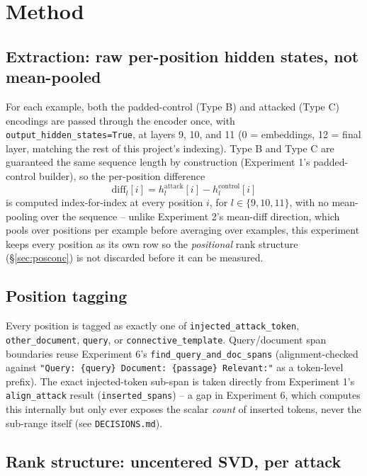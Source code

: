 \documentclass[11pt]{article}
\begin{document}
\section{Method}
\label{sec:setup}

\subsection{Extraction: raw per-position hidden states, not mean-pooled}

For each example, both the padded-control (Type B) and attacked (Type C)
encodings are passed through the encoder once, with
\texttt{output\_hidden\_states=True}, at layers 9, 10, and 11 (0 =
embeddings, 12 = final layer, matching the rest of this project's
indexing). Type B and Type C are guaranteed the same sequence length by
construction (Experiment 1's padded-control builder), so the per-position
difference
\[
\text{diff}_l[i] = h^{\text{attack}}_l[i] - h^{\text{control}}_l[i]
\]
is computed index-for-index at every position $i$, for $l \in \{9, 10,
11\}$, with no mean-pooling over the sequence -- unlike Experiment 2's
mean-diff direction, which pools over positions per example before
averaging over examples, this experiment keeps every position as its own
row so the \emph{positional} rank structure (\S\ref{sec:posconc}) is not
discarded before it can be measured.

\subsection{Position tagging}

Every position is tagged as exactly one of \texttt{injected\_attack\_token},
\texttt{other\_document}, \texttt{query}, or \texttt{connective\_template}.
Query/document span boundaries reuse Experiment 6's
\texttt{find\_query\_and\_doc\_spans} (alignment-checked against
\texttt{"Query: \{query\} Document: \{passage\} Relevant:"} as a
token-level prefix). The exact injected-token sub-span is taken directly
from Experiment 1's \texttt{align\_attack} result
(\texttt{inserted\_spans}) -- a gap in Experiment 6, which computes this
internally but only ever exposes the scalar \emph{count} of inserted
tokens, never the sub-range itself (see \texttt{DECISIONS.md}).

\subsection{Rank structure: uncentered SVD, per attack}
\end{document}
